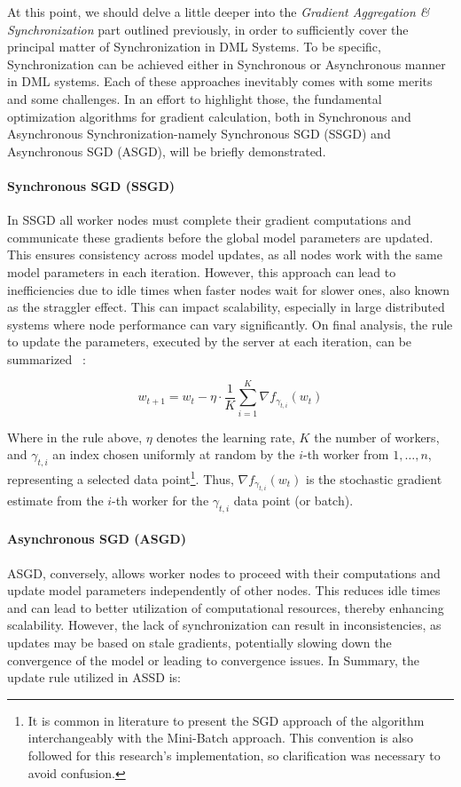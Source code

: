 At this point, we should delve a little deeper into the \emph{Gradient Aggregation \& Synchronization} part outlined previously, in order to sufficiently cover the
principal matter of Synchronization in DML Systems. To be specific, Synchronization can be achieved either in Synchronous or Asynchronous manner in DML systems.
Each of these approaches inevitably comes with some merits and some challenges. In an effort to highlight those, the fundamental optimization algorithms for
gradient calculation, both in Synchronous and Asynchronous Synchronization-namely Synchronous SGD (SSGD) and Asynchronous SGD (ASGD), will be briefly demonstrated.

\paragraph{Synchronous SGD (SSGD)} In SSGD all worker nodes must complete their gradient computations and communicate these gradients before the global model parameters are updated.
This ensures consistency across model updates, as all nodes work with the same model parameters in each iteration. However, this approach can lead to inefficiencies due
to idle times when faster nodes wait for slower ones, also known as the straggler effect. This can impact scalability, especially in large distributed systems where node
performance can vary significantly. On final analysis, the rule to update the parameters, executed by the server at each iteration, can be summarized
~\cite{chenRevisitingDistributedSynchronous2017}:

\begin{equation}
    \label{eq:ssgd}
    w_{t+1} = w_t - \eta \cdot \frac{1}{K} \sum_{i=1}^{K} \nabla f_{\gamma_{t,i}}(w_t)
\end{equation}

Where in the rule above, \emph{$\eta$} denotes the learning rate, \emph{$K$} the number of workers, and \emph{$\gamma_{t,i}$} an index chosen uniformly
at random by the $i$-th worker from ${1,\dots,n}$, representing a selected data point\footnote{It is common in literature to present the SGD approach
    of the algorithm interchangeably with the Mini-Batch approach. This convention is also followed for this research's implementation, so clarification
    was necessary to avoid confusion.}. Thus,  \emph{$\nabla f_{\gamma_{t,i}}(w_t)$} is the stochastic
gradient estimate from the $i$-th worker for the \emph{$\gamma_{t,i}$} data point (or batch).

\paragraph{Asynchronous SGD (ASGD)}
ASGD, conversely, allows worker nodes to proceed with their computations and update model parameters independently of other nodes. This reduces
idle times and can lead to better utilization of computational resources, thereby enhancing scalability. However, the lack of synchronization can result in inconsistencies,
as updates may be based on stale gradients, potentially slowing down the convergence of the model or leading to convergence issues. In Summary, the update rule utilized
in ASSD is\cite{AsynchronousDecentralizedParallel}:

